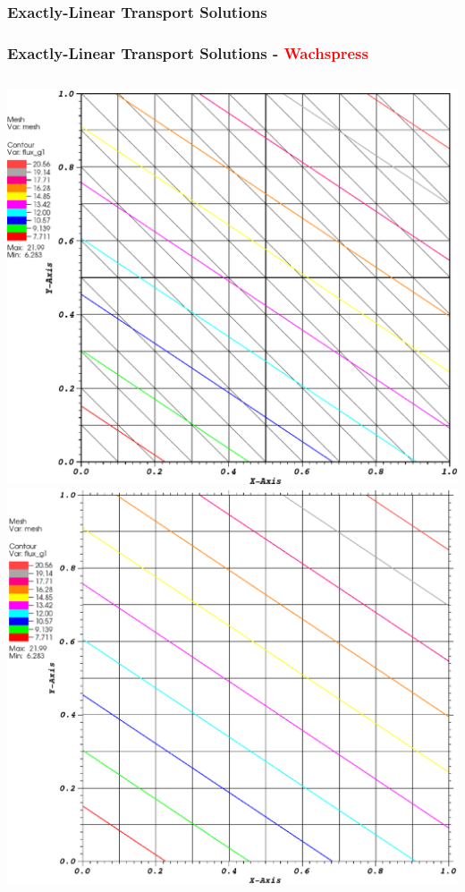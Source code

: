 \documentclass[compress,10pt]{beamer}
\newcommand{\tcr}[1]{\textcolor{red}{#1}}
\begin{document}
\begin{frame}[t]\frametitle{Exactly-Linear Transport Solutions}
{
\frametitle{Exactly-Linear Transport Solutions - \tcr{Wachspress}}
\centering
\begin{columns}
\centering
{}\includegraphics[width=0.95\columnwidth]{images/tri_WACHSPRESS_k1.eps} \\
\vspace{3mm}
{}\includegraphics[width=0.95\columnwidth]{images/cart_WACHSPRESS_k1.eps}

\end{columns}}
\end{frame}
\end{document}
